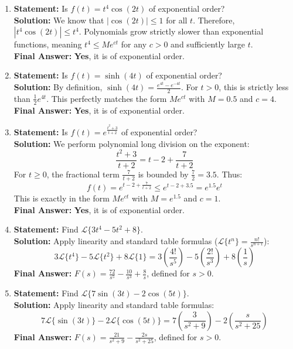 \documentclass[11pt, letterpaper]{article}
\theoremstyle{definition}
\theoremstyle{remark}
\begin{document}
\begin{enumerate}[label=\textbf{Solution \arabic*.}, leftmargin=*]
    \item \textbf{Statement:} Is $f(t) = t^4 \cos(2t)$ of exponential order?\\
    \textbf{Solution:} We know that $|\cos(2t)| \le 1$ for all $t$. Therefore, $|t^4 \cos(2t)| \le t^4$. Polynomials grow strictly slower than exponential functions, meaning $t^4 \le M e^{ct}$ for any $c > 0$ and sufficiently large $t$.\\
    \textbf{Final Answer:} \textbf{Yes}, it is of exponential order.

    \item \textbf{Statement:} Is $f(t) = \sinh(4t)$ of exponential order?\\
    \textbf{Solution:} By definition, $\sinh(4t) = \frac{e^{4t} - e^{-4t}}{2}$. For $t > 0$, this is strictly less than $\frac{1}{2}e^{4t}$. This perfectly matches the form $M e^{ct}$ with $M = 0.5$ and $c = 4$.\\
    \textbf{Final Answer:} \textbf{Yes}, it is of exponential order.

    \item \textbf{Statement:} Is $f(t) = e^{\frac{t^2+3}{t+2}}$ of exponential order?\\
    \textbf{Solution:} We perform polynomial long division on the exponent:
    \[
    \frac{t^2+3}{t+2} = t - 2 + \frac{7}{t+2}
    \]
    For $t \ge 0$, the fractional term $\frac{7}{t+2}$ is bounded by $\frac{7}{2} = 3.5$. Thus:
    \[
    f(t) = e^{t - 2 + \frac{7}{t+2}} \le e^{t - 2 + 3.5} = e^{1.5} e^t
    \]
    This is exactly in the form $M e^{ct}$ with $M = e^{1.5}$ and $c = 1$.\\
    \textbf{Final Answer:} \textbf{Yes}, it is of exponential order.

    \item \textbf{Statement:} Find $\mathscr{L}\{3t^4 - 5t^2 + 8\}$.\\
    \textbf{Solution:} Apply linearity and standard table formulas ($\mathscr{L}\{t^n\} = \frac{n!}{s^{n+1}}$):
    \[
    3\mathscr{L}\{t^4\} - 5\mathscr{L}\{t^2\} + 8\mathscr{L}\{1\} = 3\left(\frac{4!}{s^5}\right) - 5\left(\frac{2!}{s^3}\right) + 8\left(\frac{1}{s}\right)
    \]
    \textbf{Final Answer:} $F(s) = \frac{72}{s^5} - \frac{10}{s^3} + \frac{8}{s}$, defined for $s > 0$.

    \item \textbf{Statement:} Find $\mathscr{L}\{7\sin(3t) - 2\cos(5t)\}$.\\
    \textbf{Solution:} Apply linearity and standard table formulas:
    \[
    7\mathscr{L}\{\sin(3t)\} - 2\mathscr{L}\{\cos(5t)\} = 7\left(\frac{3}{s^2 + 9}\right) - 2\left(\frac{s}{s^2 + 25}\right)
    \]
    \textbf{Final Answer:} $F(s) = \frac{21}{s^2 + 9} - \frac{2s}{s^2 + 25}$, defined for $s > 0$.


\end{enumerate}
\end{document}
